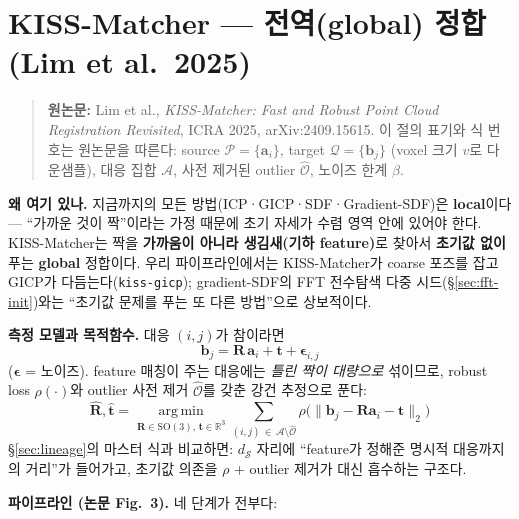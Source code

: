 \section{KISS-Matcher --- 전역(global) 정합 (Lim et al.\ 2025)}
\label{sec:kiss}

\begin{quote}
  \small\textbf{원논문:} Lim et al., \emph{KISS-Matcher: Fast and Robust
  Point Cloud Registration Revisited}, ICRA 2025, arXiv:2409.15615.
  이 절의 표기와 식 번호는 원논문을 따른다: source
  $\mathcal{P}=\{\bm{a}_i\}$, target $\mathcal{Q}=\{\bm{b}_j\}$ (voxel 크기
  $v$로 다운샘플), 대응 집합 $\mathcal{A}$, 사전 제거된 outlier
  $\hat{\mathcal{O}}$, 노이즈 한계 $\beta$.
\end{quote}

\textbf{왜 여기 있나.} 지금까지의 모든 방법(ICP·GICP·SDF·Gradient-SDF)은
\textbf{local}이다 --- ``가까운 것이 짝''이라는 가정 때문에 초기 자세가 수렴
영역 안에 있어야 한다. KISS-Matcher는 짝을 \textbf{가까움이 아니라
생김새(기하 feature)}로 찾아서 \textbf{초기값 없이} 푸는 \textbf{global}
정합이다. 우리 파이프라인에서는 KISS-Matcher가 coarse 포즈를 잡고 GICP가
다듬는다(\texttt{kiss-gicp}); gradient-SDF의 FFT 전수탐색 다중
시드(\S\ref{sec:fft-init})와는 ``초기값 문제를 푸는 또 다른 방법''으로
상보적이다.

\textbf{측정 모델과 목적함수.} 대응 $(i,j)$가 참이라면
\begin{equation*}
  \bm{b}_j = \bm{R}\,\bm{a}_i + \bm{t} + \bm{\epsilon}_{i,j}
  \tag{1}
\end{equation*}
($\bm{\epsilon}$ = 노이즈). feature 매칭이 주는 대응에는 \emph{틀린 짝이
대량으로} 섞이므로, robust loss $\rho(\cdot)$와 outlier 사전 제거
$\hat{\mathcal{O}}$를 갖춘 강건 추정으로 푼다:
\begin{equation*}
  \hat{\bm{R}},\hat{\bm{t}}
  = \operatorname*{arg\,min}_{\bm{R}\in\mathrm{SO}(3),\,\bm{t}\in\mathbb{R}^3}
  \sum_{(i,j)\,\in\,\mathcal{A}\setminus\hat{\mathcal{O}}}
  \rho\big(\lVert \bm{b}_j - \bm{R}\bm{a}_i - \bm{t}\rVert_2\big)
  \tag{2}
\end{equation*}
\S\ref{sec:lineage}의 마스터 식과 비교하면: $d_{\mathcal{S}}$ 자리에
``feature가 정해준 명시적 대응까지의 거리''가 들어가고, 초기값 의존을
$\rho$ + outlier 제거가 대신 흡수하는 구조다.

\textbf{파이프라인 (논문 Fig.~3).} 네 단계가 전부다:


